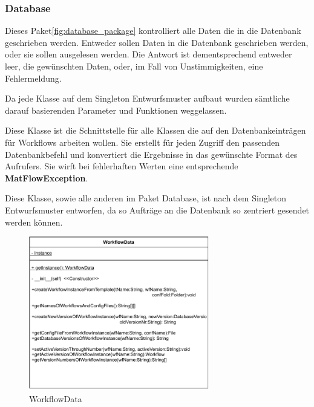 \subsubsection{\label{database} Database}

Dieses Paket\ref{fig:database_package}  kontrolliert alle Daten die in die Datenbank geschrieben werden.
Entweder sollen Daten in die Datenbank geschrieben werden, oder sie sollen ausgelesen werden. Die Antwort ist dementsprechend entweder leer, die gewünschten Daten, oder, im Fall von Unstimmigkeiten, eine Fehlermeldung.

Da jede Klasse auf dem Singleton Entwurfsmuster aufbaut wurden sämtliche darauf basierenden Parameter und Funktionen weggelassen.


Diese Klasse ist die Schnittstelle für alle Klassen die auf den Datenbankeinträgen für Workflows arbeiten wollen. Sie erstellt für jeden Zugriff den passenden Datenbankbefehl und konvertiert die Ergebnisse in das gewünschte Format des Aufrufers.
Sie wirft bei fehlerhaften Werten eine entsprechende \textbf{MatFlowException}.

Diese Klasse, sowie alle anderen im Paket Database, ist nach dem Singleton Entwurfsmuster entworfen, da so Aufträge an die Datenbank so zentriert gesendet werden können.
\begin{figure}[h]
	\centering
	\includegraphics[width=0.7\textwidth]{res/Klassen/WorkflowData.pdf} 
	\caption{WorkflowData}
	\label{fig:workflowDataClass}
\end{figure}

